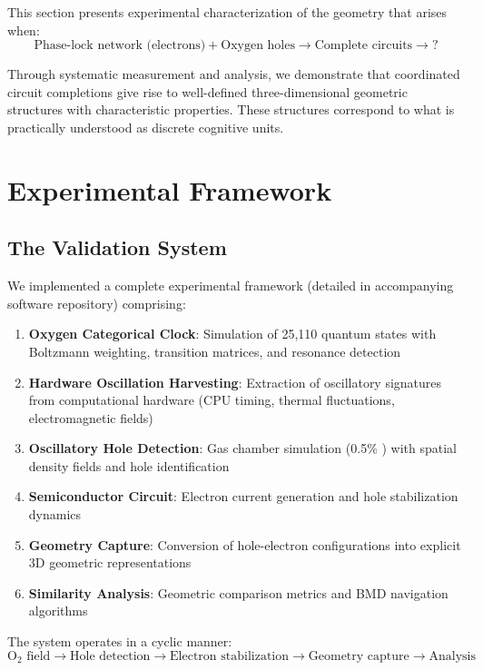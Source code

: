 \documentclass[11pt]{article}
\theoremstyle{remark}
\begin{document}
This section presents experimental characterization of the geometry that arises when:
\begin{equation}
\text{Phase-lock network (electrons)} + \text{Oxygen holes} \to \text{Complete circuits} \to \text{?}
\end{equation}

Through systematic measurement and analysis, we demonstrate that coordinated circuit completions give rise to well-defined three-dimensional geometric structures with characteristic properties. These structures correspond to what is practically understood as discrete cognitive units.

\section{Experimental Framework}

\subsection{The Validation System}

We implemented a complete experimental framework (detailed in accompanying software repository) comprising:

\begin{enumerate}
\item \textbf{Oxygen Categorical Clock}: Simulation of 25,110  quantum states with Boltzmann weighting, transition matrices, and resonance detection
\item \textbf{Hardware Oscillation Harvesting}: Extraction of oscillatory signatures from computational hardware (CPU timing, thermal fluctuations, electromagnetic fields)
\item \textbf{Oscillatory Hole Detection}: Gas chamber simulation (0.5\% ) with spatial  density fields and hole identification
\item \textbf{Semiconductor Circuit}: Electron current generation and hole stabilization dynamics
\item \textbf{Geometry Capture}: Conversion of hole-electron configurations into explicit 3D geometric representations
\item \textbf{Similarity Analysis}: Geometric comparison metrics and BMD navigation algorithms
\end{enumerate}

The system operates in a cyclic manner:
\begin{equation}
\text{O}_2 \text{ field} \to \text{Hole detection} \to \text{Electron stabilization} \to \text{Geometry capture} \to \text{Analysis}
\end{equation}
\end{document}
